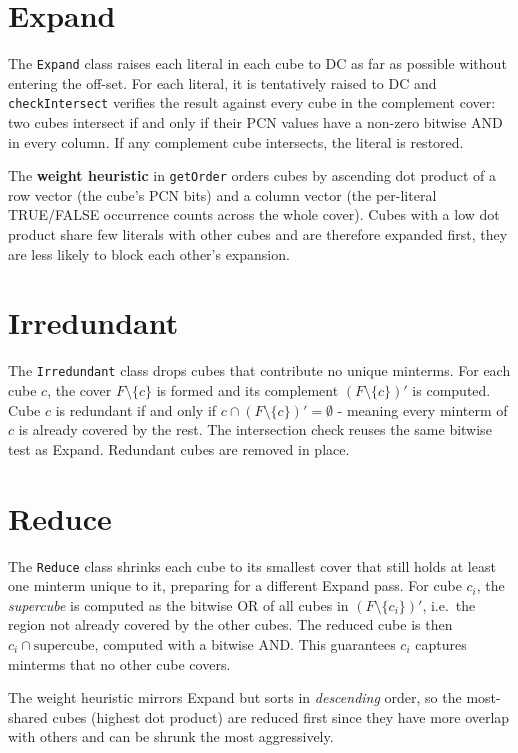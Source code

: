 \section{Expand}

The \texttt{Expand} class raises each literal in each cube to \ac{DC} as far as possible without entering the off-set. For each literal, it is tentatively raised to \ac{DC} and \texttt{checkIntersect} verifies the result against every cube in the complement cover: two cubes intersect if and only if their PCN values have a non-zero bitwise AND in every column. If any complement cube intersects, the literal is restored.

The \textbf{weight heuristic} in \texttt{getOrder} orders cubes by ascending dot product of a row vector (the cube's PCN bits) and a column vector (the per-literal TRUE/FALSE occurrence counts across the whole cover). Cubes with a low dot product share few literals with other cubes and are therefore expanded first, they are less likely to block each other's expansion.

\section{Irredundant}

The \texttt{Irredundant} class drops cubes that contribute no unique minterms. For each cube $c$, the cover $F \setminus \{c\}$ is formed and its complement $(F \setminus \{c\})'$ is computed. Cube $c$ is redundant if and only if $c \cap (F \setminus \{c\})' = \emptyset$ - meaning every minterm of $c$ is already covered by the rest. The intersection check reuses the same bitwise test as Expand. Redundant cubes are removed in place.

\section{Reduce}

The \texttt{Reduce} class shrinks each cube to its smallest cover that still holds at least one minterm unique to it, preparing for a different Expand pass. For cube $c_i$, the \emph{supercube} is computed as the bitwise OR of all cubes in $(F \setminus \{c_i\})'$, i.e.\ the region not already covered by the other cubes. The reduced cube is then $c_i \cap \text{supercube}$, computed with a bitwise AND. This guarantees $c_i$ captures minterms that no other cube covers.

The weight heuristic mirrors Expand but sorts in \emph{descending} order, so the most-shared cubes (highest dot product) are reduced first since they have more overlap with others and can be shrunk the most aggressively.

